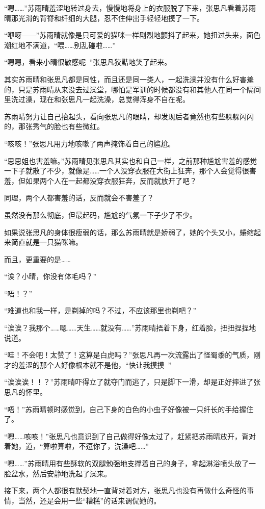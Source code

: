 “嗯……”苏雨晴羞涩地转过身去，慢慢地将身上的衣服脱了下来，张思凡看着苏雨晴那光滑的背脊和纤细的大腿，忍不住伸出手轻轻地摸了一下。

“咿呀——”苏雨晴就像是只可爱的猫咪一样剧烈地颤抖了起来，她扭过头来，面色潮红地不满道，“喂……别乱碰啦……”

“嗯嗯，看来小晴很敏感呢~”张思凡狡黠地笑了起来。

其实苏雨晴和张思凡都是同性，而且还是同一类人，一起洗澡并没有什么好害羞的，只是苏雨晴从来没去过澡堂，哪怕是军训的时候都没有和其他人在同一个隔间里洗过澡，现在和张思凡一起洗澡，总觉得浑身不自在呢。

苏雨晴努力让自己抬起头，看向张思凡的眼睛，却发现后者竟然也有些躲躲闪闪的，那张秀气的脸也有些微红。

“咳咳！”张思凡用力地咳嗽了两声掩饰着自己的尴尬。

“思思姐也害羞嘛。”苏雨晴见张思凡其实也和自己一样，之前那种尴尬害羞的感觉一下子就散了不少，就像是……一个人没穿衣服在大街上狂奔，那个人会觉得很害羞，但如果两个人在一起都没穿衣服狂奔，反而就放开了吧？

同理，两个人都害羞的话，反而就会不害羞了？

虽然没有那么彻底，但最起码，尴尬的气氛一下子少了不少。

如果说张思凡的身体很瘦弱的话，那么苏雨晴就是娇弱了，她的个头又小，蜷缩起来简直就是一只猫咪嘛。

而且，更重要的是……

“诶？小晴，你没有体毛吗？”

“唔！？”

“难道也和我一样，是剃掉的吗？不过，不应该那里也剃吧？”

“诶诶？我那个……嗯……天生……就没有……”苏雨晴捂着下身，红着脸，扭扭捏捏地说道。

“哇！不会吧！太赞了！这算是白虎吗？”张思凡再一次流露出了怪蜀黍的气质，刚才的羞涩的那个人好像根本就不是他，“快让我摸摸~”

“诶诶诶！！？”苏雨晴吓得立了就夺门而逃了，只是脚下一滑，却是正好摔进了张思凡的怀里。

“唔！”苏雨晴顿时感觉到，自己下身的白色的小虫子好像被一只纤长的手给握住了。

“嗯……咳咳！”张思凡也意识到了自己做得好像太过了，赶紧把苏雨晴放开，背对着她，道，“算啦算啦，不逗你了，洗澡吧……”

“嗯……”苏雨晴用有些酥软的双腿勉强地支撑着自己的身子，拿起淋浴喷头放了一脸盆水，然后安静地洗起了澡来。

接下来，两个人都很有默契地一直背对着对方，张思凡也没有再做什么奇怪的事情，当然，还是会用一些“糟糕”的话来调侃她的。

